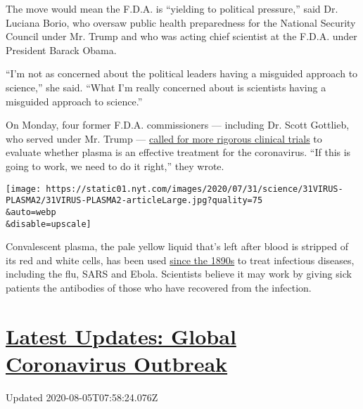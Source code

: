 The move would mean the F.D.A. is ``yielding to political pressure,''
said Dr. Luciana Borio, who oversaw public health preparedness for the
National Security Council under Mr. Trump and who was acting chief
scientist at the F.D.A. under President Barack Obama.

``I'm not as concerned about the political leaders having a misguided
approach to science,'' she said. ``What I'm really concerned about is
scientists having a misguided approach to science.''

On Monday, four former F.D.A. commissioners --- including Dr. Scott
Gottlieb, who served under Mr. Trump ---
\href{https://www.washingtonpost.com/opinions/2020/08/03/4-former-fda-commissioners-blood-plasma-might-be-covid-19-treatment-we-need/}{called
for more rigorous clinical trials} to evaluate whether plasma is an
effective treatment for the coronavirus. ``If this is going to work, we
need to do it right,'' they wrote.

\texttt{[image: https://static01.nyt.com/images/2020/07/31/science/31VIRUS-PLASMA2/31VIRUS-PLASMA2-articleLarge.jpg?quality=75\\\&auto=webp\\\&disable=upscale]}

Convalescent plasma, the pale yellow liquid that's left after blood is
stripped of its red and white cells, has been used
\href{https://www.ncbi.nlm.nih.gov/pmc/articles/PMC4781783/}{since the
1890s} to treat infectious diseases, including the flu, SARS and Ebola.
Scientists believe it may work by giving sick patients the antibodies of
those who have recovered from the infection.

\hypertarget{latest-updates-global-coronavirus-outbreak}{%
\section{\texorpdfstring{\href{https://www.nytimes.com/2020/08/04/world/coronavirus-cases.html?action=click\&pgtype=Article\&state=default\&region=MAIN_CONTENT_1\&context=storylines_live_updates}{Latest
Updates: Global Coronavirus
Outbreak}}{Latest Updates: Global Coronavirus Outbreak}}\label{latest-updates-global-coronavirus-outbreak}}

Updated 2020-08-05T07:58:24.076Z

